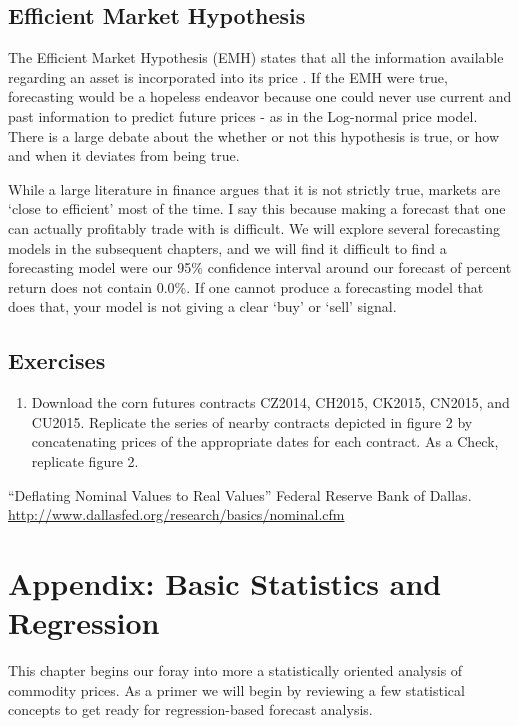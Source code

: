 \documentclass[]{book}
\providecommand{\tightlist}{%
  \setlength{\itemsep}{0pt}\setlength{\parskip}{0pt}}
\theoremstyle{definition}
\theoremstyle{definition}
\theoremstyle{remark}
\begin{document}
\section{Efficient Market Hypothesis}\label{efficient-market-hypothesis}

The Efficient Market Hypothesis (EMH) states that all the information
available regarding an asset is incorporated into its price
\citep{fama1970efficient}. If the EMH were true, forecasting would be a
hopeless endeavor because one could never use current and past
information to predict future prices - as in the Log-normal price model.
There is a large debate about the whether or not this hypothesis is
true, or how and when it deviates from being true.

While a large literature in finance argues that it is not strictly true,
markets are `close to efficient' most of the time. I say this because
making a forecast that one can actually profitably trade with is
difficult. We will explore several forecasting models in the subsequent
chapters, and we will find it difficult to find a forecasting model were
our 95\% confidence interval around our forecast of percent return does
not contain 0.0\%. If one cannot produce a forecasting model that does
that, your model is not giving a clear `buy' or `sell' signal.

\section{Exercises}\label{exercises-6}

\begin{enumerate}
\def\labelenumi{\arabic{enumi}.}
\tightlist
\item
  Download the corn futures contracts CZ2014, CH2015, CK2015, CN2015,
  and CU2015. Replicate the series of nearby contracts depicted in
  figure 2 by concatenating prices of the appropriate dates for each
  contract. As a Check, replicate figure 2.
\end{enumerate}

``Deflating Nominal Values to Real Values'' Federal Reserve Bank of
Dallas. \url{http://www.dallasfed.org/research/basics/nominal.cfm}

\chapter{Appendix: Basic Statistics and
Regression}\label{appendix-basic-statistics-and-regression}

This chapter begins our foray into more a statistically oriented
analysis of commodity prices. As a primer we will begin by reviewing a
few statistical concepts to get ready for regression-based forecast
analysis.
\end{document}
